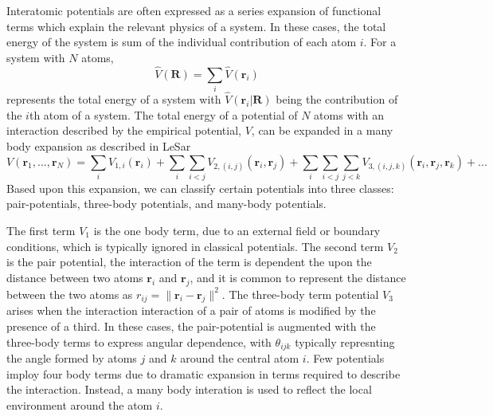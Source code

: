 Interatomic potentials are often expressed as a series expansion of functional terms which explain the relevant physics of a system.  In these cases, the total energy of the system is sum of the individual contribution of each atom $i$.  For a system with $N$ atoms,
\begin{equation}
	\label{eq:potential_energy}
	\hat{V}(\bm{R})= \sum_{i} \hat{V}(\bm{r}_i)
\end{equation}
represents the total energy of a system with $\hat{V}(\bm{r}_i \vert \bm{R})$ being the contribution of the $i$th atom of  a system.
The total energy of a potential of $N$ atoms with an interaction described by the empirical potential, $V$, can be expanded in a many body expansion as described in LeSar\cite{lesar2013_textbook}
\begin{equation}
	\label{eq:potential_expansion}
	V(\bm{r}_1,...,\bm{r}_N) =
	        \sum_i
							V_{1,i} (\bm{r}_i)
	        + \sum_i \sum_{i<j}
							V_{2,(i,j)}(\bm{r}_i,\bm{r}_j)
				  + \sum_i \sum_{i<j} \sum_{j<k} V_{3,(i,j,k)}(\bm{r}_i,\bm{r}_j,\bm{r}_k)
					+ ...
\end{equation}
Based upon this expansion, we can classify certain potentials into three classes: pair-potentials, three-body potentials, and many-body potentials.

The first term $V_1$ is the one body term, due to an external field or boundary conditions, which is typically ignored in classical potentials.  The second term $V_2$ is the pair potential, the interaction of the term is dependent the upon the distance between two atoms $\bm{r}_i$ and $\bm{r}_j$, and it is common to represent the distance between the two atoms as $r_{ij}=\lVert \bm{r}_i - \bm{r}_j \rVert^2$.  The three-body term potential $V_3$ arises when the interaction interaction of a pair of atoms is modified by the presence of a third.  In these cases, the pair-potential is augmented with the three-body terms to express angular dependence, with $\theta_{ijk}$ typically represnting the angle formed by atoms $j$ and $k$ around the central atom $i$.  Few potentials imploy four body terms due to dramatic expansion in terms required to describe the interaction.  Instead, a many body interation is used to reflect the local environment around the atom $i$.

